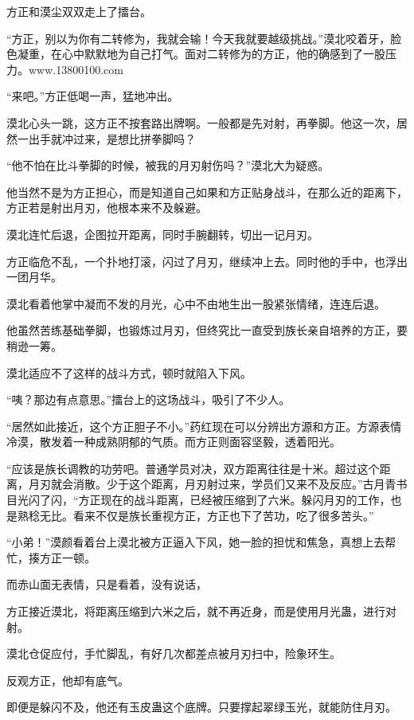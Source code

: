 
\begin{this_body}

方正和漠尘双双走上了擂台。

“方正，别以为你有二转修为，我就会输！今天我就要越级挑战。”漠北咬着牙，脸色凝重，在心中默默地为自己打气。面对二转修为的方正，他的确感到了一股压力。www.13800100.com

“来吧。”方正低喝一声，猛地冲出。

漠北心头一跳，这方正不按套路出牌啊。一般都是先对射，再拳脚。他这一次，居然一出手就冲过来，是想比拼拳脚吗？

“他不怕在比斗拳脚的时候，被我的月刃射伤吗？”漠北大为疑惑。

他当然不是为方正担心，而是知道自己如果和方正贴身战斗，在那么近的距离下，方正若是射出月刃，他根本来不及躲避。

漠北连忙后退，企图拉开距离，同时手腕翻转，切出一记月刃。

方正临危不乱，一个扑地打滚，闪过了月刃，继续冲上去。同时他的手中，也浮出一团月华。

漠北看着他掌中凝而不发的月光，心中不由地生出一股紧张情绪，连连后退。

他虽然苦练基础拳脚，也锻炼过月刃，但终究比一直受到族长亲自培养的方正，要稍逊一筹。

漠北适应不了这样的战斗方式，顿时就陷入下风。

“咦？那边有点意思。”擂台上的这场战斗，吸引了不少人。

“居然如此接近，这个方正胆子不小。”药红现在可以分辨出方源和方正。方源表情冷漠，散发着一种成熟阴郁的气质。而方正则面容坚毅，透着阳光。

“应该是族长调教的功劳吧。普通学员对决，双方距离往往是十米。超过这个距离，月刃就会消散。少于这个距离，月刃射过来，学员们又来不及反应。”古月青书目光闪了闪，“方正现在的战斗距离，已经被压缩到了六米。躲闪月刃的工作，也是熟稔无比。看来不仅是族长重视方正，方正也下了苦功，吃了很多苦头。”

“小弟！”漠颜看着台上漠北被方正逼入下风，她一脸的担忧和焦急，真想上去帮忙，揍方正一顿。

而赤山面无表情，只是看着，没有说话，

方正接近漠北，将距离压缩到六米之后，就不再近身，而是使用月光蛊，进行对射。

漠北仓促应付，手忙脚乱，有好几次都差点被月刃扫中，险象环生。

反观方正，他却有底气。

即便是躲闪不及，他还有玉皮蛊这个底牌。只要撑起翠绿玉光，就能防住月刃。


\end{this_body}
